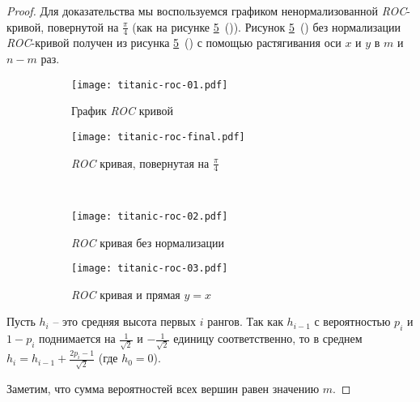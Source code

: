 \begin{proof}
    Для доказательства мы воспользуемся графиком ненормализованной
    \emph{ROC}-кривой, повернутой на $\frac{\pi}{4}$ (как на рисунке
    \ref{fig:lemma}~()).  Рисунок
    \ref{fig:lemma}~() без нормализации
    \emph{ROC}-кривой получен из рисунка
    \ref{fig:lemma}~() с помощью растягивания оси
    $x$ и $y$ в $m$ и $n-m$ раз.
    \begin{figure}
            \begin{subfigure}{.5\textwidth}
                \centering
            \texttt{[image: titanic-roc-01.pdf]}
                \caption{График \emph{ROC} кривой} 
            \label{fig:lemma:roc-start}
        \end{subfigure}%
        \begin{subfigure}{.5\textwidth}
            \centering
            \texttt{[image: titanic-roc-final.pdf]}
            \caption{\emph{ROC} кривая, повернутая на $\frac{\pi}{4}$}
            \label{fig:lemma:roc-rotation}
        \end{subfigure}\\
        \begin{subfigure}{.5\textwidth}
            \centering
            \texttt{[image: titanic-roc-02.pdf]}
            \caption{\emph{ROC} кривая без нормализации}
            \label{fig:lemma:roc-unnorm}
        \end{subfigure}%
        \begin{subfigure}{.5\textwidth}
            \centering
            \texttt{[image: titanic-roc-03.pdf]}
            \caption{\emph{ROC} кривая и прямая $y=x$}
            \label{fig:lemma:roc-idfunc}
        \end{subfigure}
        \centering
        \caption{}
        \label{fig:lemma}%
    \end{figure}

    Пусть $h_i$ -- это средняя высота первых $i$ рангов.  Так как $h_{i-1}$
    с вероятностью $p_i$ и $1-p_i$ поднимается на $\frac{1}{\sqrt{2}}$
    и $-\frac{1}{\sqrt{2}}$ единицу соответственно, то в среднем $h_{i}
    = h_{i-1} + \frac{2p_i-1}{\sqrt{2}}$ (где $h_0=0$).

    Заметим, что сумма вероятностей всех вершин равен значению $m.$


\end{proof}

